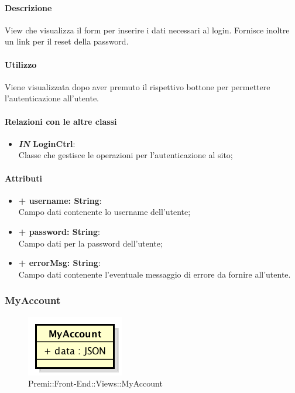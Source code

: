 	\paragraph{Descrizione}
	View che visualizza il form per inserire i dati necessari al login. Fornisce inoltre un link per il reset della password.
	
	\paragraph{Utilizzo}
	Viene visualizzata dopo aver premuto il rispettivo bottone per permettere l'autenticazione all'utente.
	
	\paragraph{Relazioni con le altre classi}
	\begin{itemize}
		\item \textbf{\textit{IN} LoginCtrl}:\\
		Classe che gestisce le operazioni per l'autenticazione al sito;
	\end{itemize}
	
	\paragraph{Attributi}
	\begin{itemize}
		\item \textbf{+ username: String}:\\
		Campo dati contenente lo username dell'utente;
		\item \textbf{+ password: String}:\\
		Campo dati per la password dell'utente;
		\item \textbf{+ errorMsg: String}:\\
		Campo dati contenente l'eventuale messaggio di errore da fornire all'utente.
	\end{itemize}


\subsubsection{MyAccount}
	\begin{figure}[h]
		\centering
		\includegraphics[width=0.3\linewidth]{img/premi_front_end_views_myaccount}
		\caption[Premi::Front-End::Views::MyAccount]{Premi::Front-End::Views::MyAccount}
	\end{figure}
	
